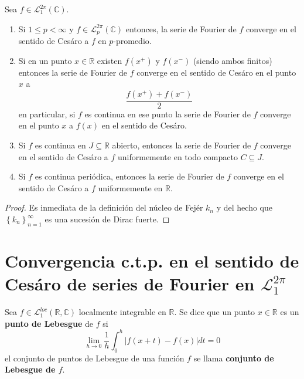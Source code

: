 \documentclass[12pt]{report}
\theoremstyle{largebreak}
\renewcommand{\leq}{\ensuremath{\leqslant}}
\newcommand\abs[1]{\ensuremath{\left|#1\right|}}
\begin{document}
    \begin{theor}
        Sea $f\in\mathcal{L}_1^{2\pi}(\mathbb{C})$.
        \begin{enumerate}
            \item Si $1\leq p<\infty$ y $f\in\mathcal{L}_p^{2\pi}(\mathbb{C})$ entonces, la serie de Fourier de $f$ converge en el sentido de Cesáro a $f$ en $p$-promedio.
            \item Si en un punto $x\in\mathbb{R}$ existen $f(x^+)$ y $f(x^-)$ (siendo ambos finitos) entonces la serie de Fourier de $f$ converge en el sentido de Cesáro en el punto $x$ a
            \begin{equation*}
                \frac{f(x^+)+f(x^-)}{2}
            \end{equation*}
            en particular, si $f$ es continua en ese punto la serie de Fourier de $f$ converge en el punto $x$ a $f(x)$ en el sentido de Cesáro.
            \item Si $f$ es continua en $J\subseteq\mathbb{R}$ abierto, entonces la serie de Fourier de $f$ converge en el sentido de Cesáro a $f$ uniformemente en todo compacto $C\subseteq J$.
            \item Si $f$ es continua periódica, entonces la serie de Fourier de $f$ converge en el sentido de Cesáro a $f$ uniformemente en $\mathbb{R}$.
        \end{enumerate}
    \end{theor}

    \begin{proof}
        Es inmediata de la definición del núcleo de Fejér $k_n$ y del hecho que $\left\{k_n \right\}_{ n=1}^\infty$ es una sucesión de Dirac fuerte.
    \end{proof}

    \section{Convergencia c.t.p. en el sentido de Cesáro de series de Fourier en $\mathcal{L}_1^{2\pi}$}

    \begin{mydef}
        Sea $f\in\mathcal{L}_1^{loc}(\mathbb{R},\mathbb{C})$ localmente integrable en $\mathbb{R}$. Se dice que un punto $x\in\mathbb{R}$ es un \textbf{punto de Lebesgue} de $f$ si
        \begin{equation*}
            \lim_{ h\rightarrow 0}\frac{1}{h}\int_0^h\abs{f(x+t)-f(x)}dt=0
        \end{equation*}
        el conjunto de puntos de Lebesgue de una función $f$ se llama \textbf{conjunto de Lebesgue de $f$}.
    \end{mydef}
\end{document}

